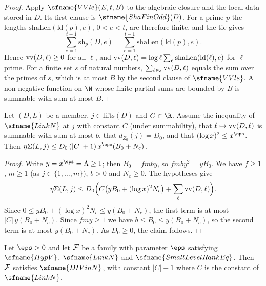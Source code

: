 \begin{proof}
Apply $\sfname{VVle}(E,t,B)$ to the algebraic closure and the local data stored in $D$. Its first clause is
$\sfname{ShaFinOdd}(D)$. For a prime $p$ the lengths $\mathrm{shaLen}(\mathrm{ld}(p),e)$, $0<e<t$, are therefore
finite, and the tie gives
\[
\sum_{e=1}^{t-1}\mathrm{sh}_p(D,e)=\sum_{e=1}^{t-1}\mathrm{shaLen}(\mathrm{ld}(p),e).
\]
Hence $\mathrm{vv}(D,\ell)\ge0$ for all $\ell$, and $\mathrm{vv}(D,\ell)=\log\ell\sum_e\mathrm{shaLen}(\mathrm{ld}(\ell),e)$
for $\ell$ prime. For a finite set $s$ of natural numbers, $\sum_{\ell\in s}\mathrm{vv}(D,\ell)$ equals the
sum over the primes of $s$, which is at most $B$ by the second clause of $\sfname{VVle}$. A non-negative function
on $\N$ whose finite partial sums are bounded by $B$ is summable with sum at most $B$.
\end{proof}

\begin{lemma}\label{pf:top-shape:divinat}
Let $(D,L)$ be a member, $j\in\mathrm{lifts}(D)$ and $C\in\R$. Assume the inequality of $\sfname{LinkN}$ at $j$
with constant $C$ (under summability), that $\ell\mapsto\mathrm{vv}(D,\ell)$ is summable with sum at most $b$,
that $d_{Z_0}(j)=D_0$, and that $(\log x)^2\le x^{\eps}$. Then
$\topshapeEta(L,j)\le D_0\,(|C|+1)\,x^{\eps}(B_0+N_c)$.
\end{lemma}

\begin{proof}
Write $y=x^{\eps}=\Lambda\ge1$; then $B_0=fmby$, so $fmby^2=yB_0$. We have $f\ge1$, $m\ge1$ (as $j\in\{1,\dots,m\}$),
$b>0$ and $N_c\ge0$. The hypotheses give
\[
\eta\Sigma(L,j)\le D_0\Bigl(C\bigl(yB_0+(\log x)^2N_c\bigr)+\sum_\ell\mathrm{vv}(D,\ell)\Bigr).
\]
Since $0\le yB_0+(\log x)^2N_c\le y(B_0+N_c)$, the first term is at most $|C|\,y(B_0+N_c)$. Since $fmy\ge1$ we
have $b\le B_0\le y(B_0+N_c)$, so the second term is at most $y(B_0+N_c)$. As $D_0\ge0$, the claim follows.
\end{proof}

\begin{lemma}\label{pf:top-shape:divinN}
Let $\eps>0$ and let $\mathcal{F}$ be a family with parameter $\eps$ satisfying $\sfname{HypV}$,
$\sfname{LinkN}$ and $\sfname{SmallLevelRankEq}$. Then $\mathcal{F}$ satisfies $\sfname{DIVinN}$, with constant
$|C|+1$ where $C$ is the constant of $\sfname{LinkN}$.
\end{lemma}

